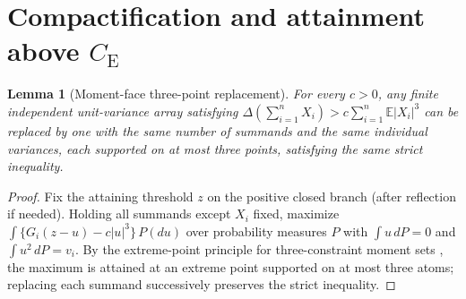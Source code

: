 \documentclass[11pt]{article}
\numberwithin{equation}{section}
\newtheorem{lemma}[theorem]{Lemma}
\theoremstyle{definition}
\newcommand{\E}{\mathbb E}
\newcommand{\ce}{C_{\mathrm E}}
\begin{document}
\section{Compactification and attainment above $\ce$}\label{sec:compactness}

\begin{lemma}[Moment-face three-point replacement]\label{lem:threepoint}
For every $c>0$, any finite independent unit-variance array satisfying
$\Delta(\sum_{i=1}^nX_i)>c\sum_{i=1}^n\E|X_i|^3$ can be replaced by one with
the same number of summands and the same individual variances, each supported
on at most three points, satisfying the same strict inequality.
\end{lemma}
\begin{proof}
Fix the attaining threshold $z$ on the positive closed branch (after
reflection if needed). Holding all summands except $X_i$ fixed, maximize
$\int\{G_i(z-u)-c|u|^3\}\,P(du)$ over probability measures $P$ with
$\int u\,dP=0$ and $\int u^2\,dP=v_i$. By the extreme-point principle for
three-constraint moment sets \citep{Winkler1988,BellFinite2026}, the maximum
is attained at an extreme point supported on at most three atoms; replacing
each summand successively preserves the strict inequality.
\end{proof}
\end{document}
